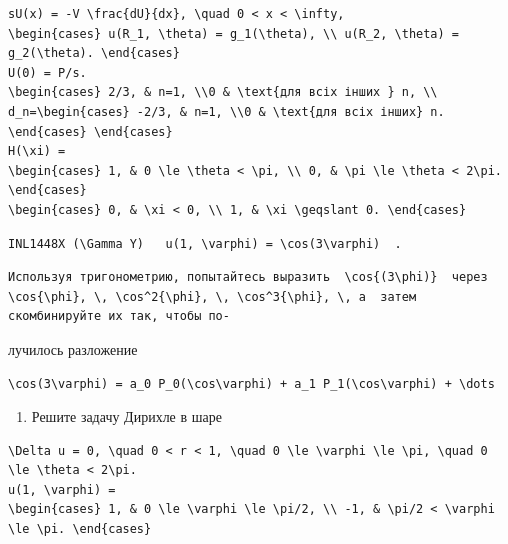 \documentclass[
  ukrainian,
]{article}
\providecommand{\tightlist}{%
  \setlength{\itemsep}{0pt}\setlength{\parskip}{0pt}}
\begin{document}
\begin{verbatim}
sU(x) = -V \frac{dU}{dx}, \quad 0 < x < \infty,
\begin{cases} u(R_1, \theta) = g_1(\theta), \\ u(R_2, \theta) = g_2(\theta). \end{cases}
U(0) = P/s.
\begin{cases} 2/3, & n=1, \\0 & \text{для всіх інших } n, \\ d_n=\begin{cases} -2/3, & n=1, \\0 & \text{для всіх інших} n. \end{cases} \end{cases}
H(\xi) =
\begin{cases} 1, & 0 \le \theta < \pi, \\ 0, & \pi \le \theta < 2\pi. \end{cases}
\begin{cases} 0, & \xi < 0, \\ 1, & \xi \geqslant 0. \end{cases}
\end{verbatim}

\begin{verbatim}
INL1448X (\Gamma Y)   u(1, \varphi) = \cos(3\varphi)  .
\end{verbatim}

\begin{verbatim}
Используя тригонометрию, попытайтесь выразить  \cos{(3\phi)}  через  \cos{\phi}, \, \cos^2{\phi}, \, \cos^3{\phi}, \, a  затем скомбинируйте их так, чтобы по-
\end{verbatim}

лучилось разложение

\begin{verbatim}
\cos(3\varphi) = a_0 P_0(\cos\varphi) + a_1 P_1(\cos\varphi) + \dots
\end{verbatim}

\begin{enumerate}
\def\labelenumi{\arabic{enumi}.}
\setcounter{enumi}{4}
\tightlist
\item
  Решите задачу Дирихле в шаре
\end{enumerate}

\begin{verbatim}
\Delta u = 0, \quad 0 < r < 1, \quad 0 \le \varphi \le \pi, \quad 0 \le \theta < 2\pi.
u(1, \varphi) =
\begin{cases} 1, & 0 \le \varphi \le \pi/2, \\ -1, & \pi/2 < \varphi \le \pi. \end{cases}
\end{verbatim}
\end{document}
